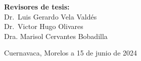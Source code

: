 \begin{titlepage}
\begin{minipage}{0.52\textwidth}
\begin{flushright}
\begin{center}
            \textbf{Revisores de tesis:}\\
    
            Dr.\ Luis Gerardo Vela Valdés\\
            Dr.\ Victor Hugo Olivares\\
            Dra. Marisol Cervantes Bobadilla\\
    
            
    \end{center}
    \end{flushright}
    \end{minipage}	
    \vspace*{3cm}
    
    \begin{flushright}
    {\large Cuernavaca, Morelos a 15 de junio de 2024}
    \end{flushright}
    
    \end{titlepage}